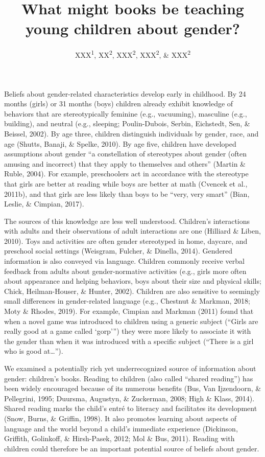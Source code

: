 \documentclass[
  english,
  ,man,floatsintext]{apa6}
\title{What might books be teaching young children about gender?}
\author{XXX\textsuperscript{1}, XX\textsuperscript{2}, XXX\textsuperscript{2}, XXX\textsuperscript{2}, \& XXX\textsuperscript{2}}
\date{}
\affiliation{\vspace{0.5cm}\textsuperscript{1} XXX\\\textsuperscript{2} XXX}
\begin{document}
\maketitle

Beliefs about gender-related characteristics develop early in childhood. By 24 months (girls) or 31 months (boys) children already exhibit knowledge of behaviors that are stereotypically feminine (e.g., vacuuming), masculine (e.g., building), and neutral (e.g., sleeping; Poulin-Dubois, Serbin, Eichstedt, Sen, \& Beissel, 2002). By age three, children distinguish individuals by gender, race, and age (Shutts, Banaji, \& Spelke, 2010). By age five, children have developed assumptions about gender \enquote{a constellation of stereotypes about gender (often amusing and incorrect) that they apply to themselves and others} (Martin \& Ruble, 2004). For example, preschoolers act in accordance with the stereotype that girls are better at reading while boys are better at math (Cvencek et al., 2011b), and that girls are less likely than boys to be \enquote{very, very smart} (Bian, Leslie, \& Cimpian, 2017).

The sources of this knowledge are less well understood. Children's interactions with adults and their observations of adult interactions are one (Hilliard \& Liben, 2010). Toys and activities are often gender stereotyped in home, daycare, and preschool social settings (Weisgram, Fulcher, \& Dinella, 2014). Gendered information is also conveyed via language. Children commonly receive verbal feedback from adults about gender-normative activities (e.g., girls more often about appearance and helping behaviors, boys about their size and physical skills; Chick, Heilman-Houser, \& Hunter, 2002). Children are also sensitive to seemingly small differences in gender-related language (e.g., Chestnut \& Markman, 2018; Moty \& Rhodes, 2019). For example, Cimpian and Markman (2011) found that when a novel game was introduced to children using a generic subject (\enquote{Girls are really good at a game called \enquote{gorp}}) they were more likely to associate it with the gender than when it was introduced with a specific subject (\enquote{There is a girl who is good at\ldots{}}).

We examined a potentially rich yet underrecognized source of information about gender: children's books. Reading to children (also called \enquote{shared reading}) has been widely encouraged because of its numerous benefits (Bus, Van Ijzendoorn, \& Pellegrini, 1995; Duursma, Augustyn, \& Zuckerman, 2008; High \& Klass, 2014). Shared reading marks the child's entré to literacy and facilitates its development (Snow, Burns, \& Griffin, 1998). It also promotes learning about aspects of language and the world beyond a child's immediate experience (Dickinson, Griffith, Golinkoff, \& Hirsh-Pasek, 2012; Mol \& Bus, 2011). Reading with children could therefore be an important potential source of beliefs about gender.
\end{document}
